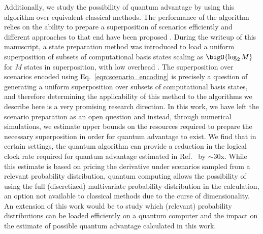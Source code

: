 \begin{enumerate}
Additionally, we study the possibility of quantum advantage by using this algorithm over equivalent classical methods.
The performance of the algorithm relies on the ability to prepare a superposition of scenarios efficiently and different approaches to that end have been proposed \cite{chakrabarti2021threshold, milek2020quantum, zhu2022copula}.
During the writeup of this manuscript, a state preparation method was introduced to load a uniform superposition of subsets of computational basis states scaling as $\bigO{\log_2 M}$ for $M$ states in superposition, with low overhead \cite{Shukla_2024}.
The superposition over scenarios encoded using Eq.~\eqref{eqn:scenario_encoding} is precisely a question of generating a uniform superposition over subsets of computational basis states, and therefore determining the applicability of this method to the \var{} algorithms we describe here is a very promising research direction.
In this work, we have left the scenario preparation as an open question and instead, through numerical simulations, we estimate upper bounds on the resources required to prepare the necessary superposition in order for quantum advantage to exist.
We find that in certain settings, the quantum algorithm can provide a reduction in the logical clock rate required for quantum advantage estimated in Ref.~\cite{stamatopoulos2023derivative} by $\sim 30$x.
While this estimate is based on pricing the derivative under scenarios sampled from a relevant probability distribution, quantum computing allows the possibility of using the full (discretized) multivariate probability distribution in the calculation, an option not available to classical methods due to the curse of dimensionality.
An extension of this work would be to study which (relevant) probability distributions can be loaded efficiently on a quantum computer and the impact on the estimate of possible quantum advantage calculated in this work.


\end{enumerate}
